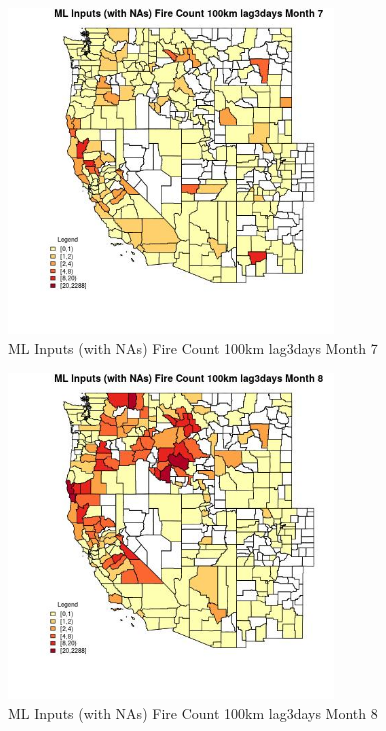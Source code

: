 \begin{figure} 
\centering  
\includegraphics[width=0.77\textwidth]{Code_Outputs/Report_ML_input_PM25_Step4_part_e_de_duplicated_aves_compiled_2019-05-20wNAs_CountyFire_Count_100km_lag3daysmedianMonth7.jpg} 
\caption{\label{fig:Report_ML_input_PM25_Step4_part_e_de_duplicated_aves_compiled_2019-05-20wNAsCountyFire_Count_100km_lag3daysmedianMonth7}ML Inputs (with NAs) Fire Count 100km lag3days Month 7} 
\end{figure} 
 

\begin{figure} 
\centering  
\includegraphics[width=0.77\textwidth]{Code_Outputs/Report_ML_input_PM25_Step4_part_e_de_duplicated_aves_compiled_2019-05-20wNAs_CountyFire_Count_100km_lag3daysmedianMonth8.jpg} 
\caption{\label{fig:Report_ML_input_PM25_Step4_part_e_de_duplicated_aves_compiled_2019-05-20wNAsCountyFire_Count_100km_lag3daysmedianMonth8}ML Inputs (with NAs) Fire Count 100km lag3days Month 8} 
\end{figure} 
 

